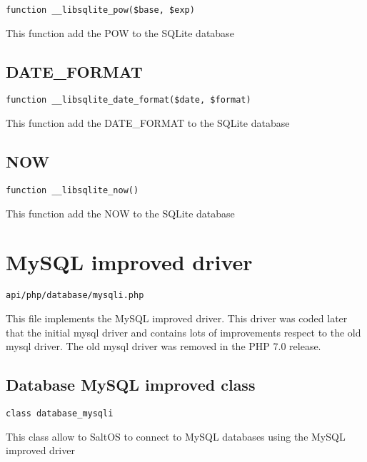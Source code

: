 \documentclass[a4paper]{book}
\begin{document}
\begin{lstlisting}
function __libsqlite_pow($base, $exp)
\end{lstlisting}

This function add the POW to the SQLite database

\hypertarget{toc330}{}
\subsection{DATE\_FORMAT}

\begin{lstlisting}
function __libsqlite_date_format($date, $format)
\end{lstlisting}

This function add the DATE\_FORMAT to the SQLite database

\hypertarget{toc331}{}
\subsection{NOW}

\begin{lstlisting}
function __libsqlite_now()
\end{lstlisting}

This function add the NOW to the SQLite database

\hypertarget{toc332}{}
\section{MySQL improved driver}

\begin{lstlisting}
api/php/database/mysqli.php
\end{lstlisting}

This file implements the MySQL improved driver. This driver was coded later that the initial
mysql driver and contains lots of improvements respect to the old mysql driver. The old mysql
driver was removed in the PHP 7.0 release.

\hypertarget{toc333}{}
\subsection{Database MySQL improved class}

\begin{lstlisting}
class database_mysqli
\end{lstlisting}

This class allow to SaltOS to connect to MySQL databases using the MySQL improved driver
\end{document}
